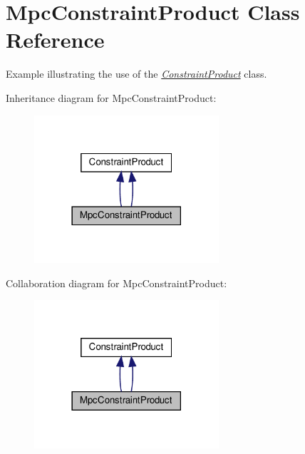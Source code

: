 \hypertarget{class_mpc_constraint_product}{}\section{Mpc\+Constraint\+Product Class Reference}
\label{class_mpc_constraint_product}


Example illustrating the use of the {\itshape \hyperlink{class_constraint_product}{Constraint\+Product}} class.  




Inheritance diagram for Mpc\+Constraint\+Product\+:
\nopagebreak
\begin{figure}[H]
\begin{center}
\leavevmode
\includegraphics[width=194pt]{class_mpc_constraint_product__inherit__graph}
\end{center}
\end{figure}


Collaboration diagram for Mpc\+Constraint\+Product\+:
\nopagebreak
\begin{figure}[H]
\begin{center}
\leavevmode
\includegraphics[width=194pt]{class_mpc_constraint_product__coll__graph}
\end{center}
\end{figure}
